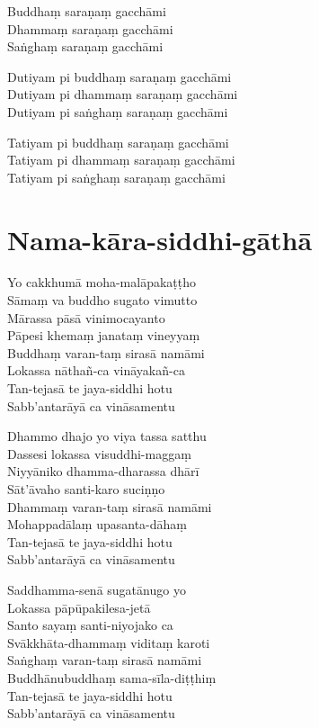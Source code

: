 
\begin{paritta}
Buddhaṃ saraṇaṃ gacchāmi\\
Dhammaṃ saraṇaṃ gacchāmi\\
Saṅghaṃ saraṇaṃ gacchāmi

Dutiyam pi buddhaṃ saraṇaṃ gacchāmi\\
Dutiyam pi dhammaṃ saraṇaṃ gacchāmi\\
Dutiyam pi saṅghaṃ saraṇaṃ gacchāmi

Tatiyam pi buddhaṃ saraṇaṃ gacchāmi\\
Tatiyam pi dhammaṃ saraṇaṃ gacchāmi\\
Tatiyam pi saṅghaṃ saraṇaṃ gacchāmi
\end{paritta}

\clearpage

\chapter{Nama-kāra-siddhi-gāthā}%


\begin{paritta}
Yo cakkhumā moha-malāpakaṭṭho\\
Sāmaṃ va buddho sugato vimutto\\
Mārassa pāsā vinimocayanto\\
Pāpesi khemaṃ janataṃ vineyyaṃ\\
Buddhaṃ varan-taṃ sirasā namāmi\\
Lokassa nāthañ-ca vināyakañ-ca\\
Tan-tejasā te jaya-siddhi hotu\\
Sabb'antarāyā ca vināsamentu

Dhammo dhajo yo viya tassa satthu\\
Dassesi lokassa visuddhi-maggaṃ\\
Niyyāniko dhamma-dharassa dhārī\\
Sāt'āvaho santi-karo suciṇṇo\\
Dhammaṃ varan-taṃ sirasā namāmi\\
Mohappadālaṃ upasanta-dāhaṃ\\
Tan-tejasā te jaya-siddhi hotu\\
Sabb'antarāyā ca vināsamentu

Saddhamma-senā sugatānugo yo\\
Lokassa pāpūpakilesa-jetā\\
Santo sayaṃ santi-niyojako ca\\
Svākkhāta-dhammaṃ viditaṃ karoti\\
Saṅghaṃ varan-taṃ sirasā namāmi\\
Buddhānubuddhaṃ sama-sīla-diṭṭhiṃ\\
Tan-tejasā te jaya-siddhi hotu\\
Sabb'antarāyā ca vināsamentu
\end{paritta}

